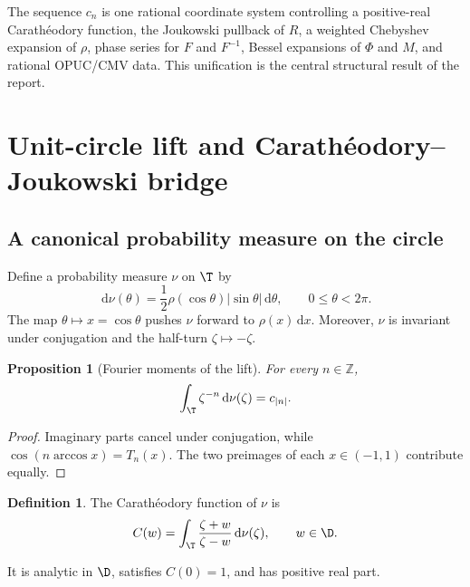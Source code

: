 \documentclass[11pt,oneside]{article}
\newtheorem{proposition}[theorem]{Proposition}
\theoremstyle{definition}
\newtheorem{definition}[theorem]{Definition}
\newcommand{\dd}{\,\mathrm d}
\newcommand{\Z}{\mathbb Z}
\begin{document}
\begin{novelbox}
The sequence \(c_n\) is one rational coordinate system controlling a positive-real
Carath\'eodory function, the Joukowski pullback of \(R\), a weighted Chebyshev expansion of
\(\rho\), phase series for \(F\) and \(F^{-1}\), Bessel expansions of \(\Phi\) and \(M\),
and rational OPUC/CMV data. This unification is the central structural result of the report.
\end{novelbox}

\section{Unit-circle lift and Carath\'eodory--Joukowski bridge}
\label{p4:sec:circle}

\subsection{A canonical probability measure on the circle}

Define a probability measure \(\nu\) on \(\T\) by
\begin{equation}
 \dd\nu(\theta)=\frac12\rho(\cos\theta)|\sin\theta|\dd\theta,
 \qquad 0\le\theta<2\pi.
 \label{p4:eq:circle-lift}
\end{equation}
The map \(\theta\mapsto x=\cos\theta\) pushes \(\nu\) forward to \(\rho(x)\dd x\). Moreover,
\(\nu\) is invariant under conjugation and the half-turn \(\zeta\mapsto-\zeta\).

\begin{proposition}[Fourier moments of the lift]
\label{p4:prop:circle-moments}
For every \(n\in\Z\),
\begin{equation}
 \int_{\T}\zeta^{-n}\dd\nu(\zeta)=c_{|n|}.
 \label{p4:eq:nu-moments}
\end{equation}
\end{proposition}

\begin{proof}
Imaginary parts cancel under conjugation, while
\(\cos(n\arccos x)=T_n(x)\). The two preimages of each \(x\in(-1,1)\) contribute equally.
\end{proof}

\begin{definition}
The Carath\'eodory function of \(\nu\) is
\begin{equation}
 C(w)=\int_{\T}\frac{\zeta+w}{\zeta-w}\dd\nu(\zeta),
 \qquad w\in\D.
 \label{p4:eq:C-def}
\end{equation}
\end{definition}
It is analytic in \(\D\), satisfies \(C(0)=1\), and has positive real part.
\end{document}
